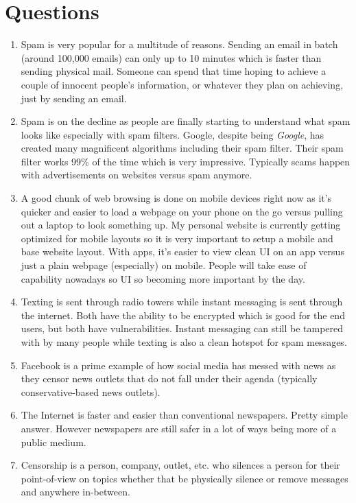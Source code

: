 \documentclass[12pt]{article}
\begin{document}
\section{Questions}
    \begin{enumerate}
        \item Spam is very popular for a multitude of reasons. Sending an email in batch (around 100,000 emails) can only up to 10 minutes which is faster than sending physical mail. Someone can spend that time hoping to achieve a couple of innocent people's information, or whatever they plan on achieving, just by sending an email. 
        \item Spam is on the decline as people are finally starting to understand what spam looks like especially with spam filters. Google, despite being \emph{Google}, has created many magnificent algorithms including their spam filter. Their spam filter works 99\% of the time which is very impressive. Typically scams happen with advertisements on websites versus spam anymore.
        \item A good chunk of web browsing is done on mobile devices right now as it's quicker and easier to load a webpage on your phone on the go versus pulling out a laptop to look something up. My personal website is currently getting optimized for mobile layouts so it is very important to setup a mobile and base website layout. With apps, it's easier to view clean UI on an app versus just a plain webpage (especially) on mobile. People will take ease of capability nowadays so UI so becoming more important by the day.
        \item Texting is sent through radio towers while instant messaging is sent through the internet. Both have the ability to be encrypted which is good for the end users, but both have vulnerabilities. Instant messaging can still be tampered with by many people while texting is also a clean hotspot for spam messages.
        \item Facebook is a prime example of how social media has messed with news as they censor news outlets that do not fall under their agenda (typically conservative-based news outlets).
        \item The Internet is faster and easier than conventional newspapers. Pretty simple answer. However newspapers are still safer in a lot of ways being more of a public medium.
        \item Censorship is a person, company, outlet, etc. who silences a person for their point-of-view on topics whether that be physically silence or remove messages and anywhere in-between.

\end{enumerate}
\end{document}

